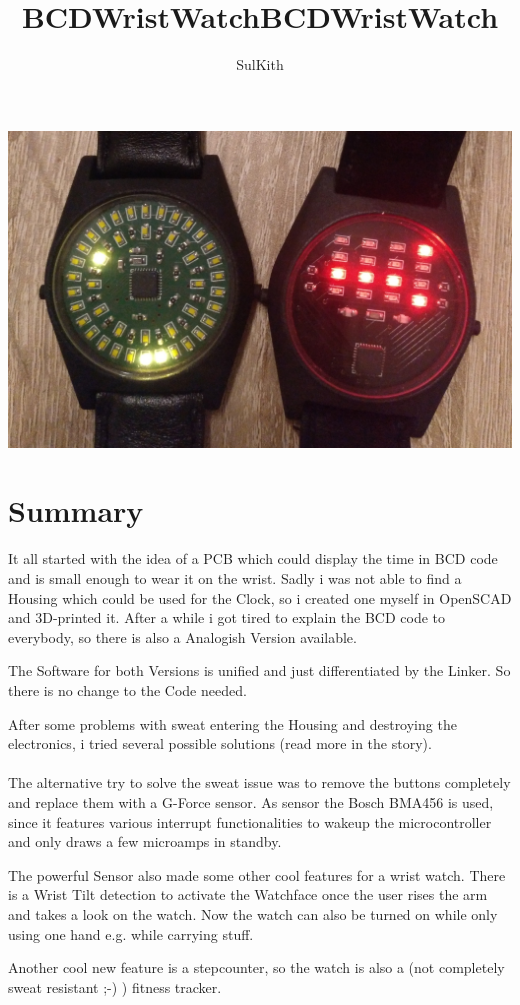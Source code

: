 \documentclass[12pt,a4paper,final]{article}
\title{BCDWristWatch}
\date{\vspace{-10ex}}
\begin{document}
\title{BCDWristWatch}
\author{SulKith}
\maketitle
\vspace{5cm}
\begin{center}
  \includegraphics[width=\textwidth]{../Pictures/AnalogClock.jpg}
\end{center}
\newpage
\section*{Summary}
It all started with the idea of a PCB which could display the time in BCD code and is small enough to wear it on the wrist. Sadly i was not able to find a Housing which could be used for the Clock, so i created one myself in OpenSCAD and 3D-printed it.
After a while i got tired to explain the BCD code to everybody, so there is also a Analogish Version available.

The Software for both Versions is unified and just differentiated by the Linker. So there is no change to the Code needed.

After some problems with sweat entering the Housing and destroying the electronics, i tried several possible solutions (read more in the story).
\\
\\
The alternative try to solve the sweat issue was to remove the buttons completely and replace them with a G-Force sensor. As sensor the Bosch BMA456 is used, since it features various interrupt functionalities to wakeup the microcontroller and only draws a few microamps in standby.

The powerful Sensor also made some other cool features for a wrist watch.
There is a Wrist Tilt detection to activate the Watchface once the user rises the arm and takes a look on the watch. Now the watch can also be turned on while only using one hand e.g. while carrying stuff.

Another cool new feature is a stepcounter, so the watch is also a (not completely sweat resistant ;-) ) fitness tracker.




\end{document}
